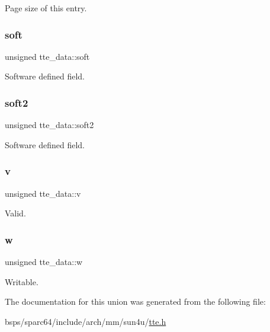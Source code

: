 Page size of this entry. \mbox{\label{uniontte__data_ae0e85f3f1cf0fd0355a82aabafe73161}} 
\subsubsection{\texorpdfstring{soft}{soft}}
{\footnotesize\ttfamily unsigned tte\+\_\+data\+::soft}

Software defined field. \mbox{\label{uniontte__data_aaf148824c9b193c7e099a1a627ad7f3b}} 
\subsubsection{\texorpdfstring{soft2}{soft2}}
{\footnotesize\ttfamily unsigned tte\+\_\+data\+::soft2}

Software defined field. \mbox{\label{uniontte__data_a70241fa15ba35540a3d739586d288a63}} 
\subsubsection{\texorpdfstring{v}{v}}
{\footnotesize\ttfamily unsigned tte\+\_\+data\+::v}

Valid. \mbox{\label{uniontte__data_a3b6a0e0483211b6f9372308f80718a8a}} 
\subsubsection{\texorpdfstring{w}{w}}
{\footnotesize\ttfamily unsigned tte\+\_\+data\+::w}

Writable. 

The documentation for this union was generated from the following file\+:\begin{DoxyCompactItemize}
\item 
bsps/sparc64/include/arch/mm/sun4u/\mbox{\hyperlink{sun4u_2tte_8h}{tte.\+h}}\end{DoxyCompactItemize}
